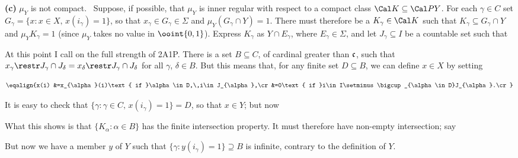 {\medskip

{\bf (c)} $\mu_Y$ is not compact.   \Prf\Quer\ Suppose, if possible,
that $\mu_Y$ is inner regular with respect to a compact class
$\Cal K\subseteq\Cal PY$.   For each $\gamma\in C$ set
$G_{\gamma}=\{x:x\in X,\,x(i_{\gamma})=1\}$, so that
$x_{\gamma}\in G_{\gamma}\in\Sigma$ and
$\mu_Y(G_{\gamma}\cap Y)=1$.   There must
therefore be a $K_{\gamma}\in\Cal K$ such that
$K_{\gamma}\subseteq G_{\gamma}\cap Y$ and $\mu_YK_{\gamma}=1$ (since
$\mu_Y$ takes no value in
$\ooint{0,1}$).   Express $K_{\gamma}$ as $Y\cap E_{\gamma}$, where
$E_{\gamma}\in\Sigma$, and let $J_{\gamma}\subseteq I$ be a countable
set such that


At this point I call on the full strength of 2A1P.   There is a set
$B\subseteq C$, of cardinal greater than $\frak c$, such that
$x_{\gamma}\restr J_{\gamma}\cap J_{\delta}
=x_{\delta}\restr J_{\gamma}\cap J_{\delta}$ for all $\gamma$,
$\delta\in B$.   But this means that, for any
finite set $D\subseteq B$, we can define $x\in X$ by setting

$$\eqalign{x(i)
&=x_{\alpha}(i)\text{ if }\alpha\in D,\,i\in J_{\alpha},\cr
&=0\text{ if }i\in I\setminus\bigcup_{\alpha\in D}J_{\alpha}.\cr}$$

\noindent It is easy to check that
$\{\gamma:\gamma\in C,\,x(i_{\gamma})=1\}=D$, so that $x\in Y$;  but now


What this shows is that $\{K_{\alpha}:\alpha\in B\}$ has the finite
intersection property.   It must therefore have non-empty intersection;
say


\noindent But now we have a member $y$ of $Y$ such that
$\{\gamma:y(i_{\gamma})=1\}\supseteq B$ is infinite, contrary to the
definition of $Y$.\ \Bang\Qed
}%

